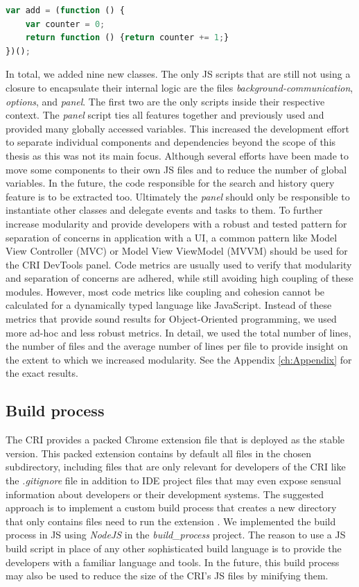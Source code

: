 \begin{lstlisting}[language=JavaScript, caption={Example of RxJS code.},label={lst:closure}]
var add = (function () {
	var counter = 0;
	return function () {return counter += 1;}
})();
\end{lstlisting}
In total, we added nine new classes. The only JS scripts that are still not using a closure to encapsulate their internal logic are the files \emph{background-communication}, \emph{options}, and \emph{panel}. The first two are the only scripts inside their respective context. The \emph{panel} script ties all features together and previously used and provided many globally accessed variables. This increased the development effort to separate individual components and dependencies beyond the scope of this thesis as this was not its main focus. Although several efforts have been made to move some components to their own JS files and to reduce the number of global variables. In the future, the code responsible for the search and history query feature is to be extracted too. Ultimately the \emph{panel} should only be responsible to instantiate other classes and delegate events and tasks to them. To further increase modularity and provide developers with a robust and tested pattern for separation of concerns in application with a UI, a common pattern like Model View Controller (MVC) or Model View ViewModel (MVVM) should be used for the CRI DevTools panel.
Code metrics are usually used to verify that modularity and separation of concerns are adhered, while still avoiding high coupling of these modules. However, most code metrics like coupling and cohesion \cite{Coupling} cannot be calculated for a dynamically typed language like JavaScript. Instead of these metrics that provide sound results for Object-Oriented programming, we used more ad-hoc and less robust metrics. In detail, we used the total number of lines, the number of files and the average number of lines per file to provide insight on the extent to which we increased modularity. See the Appendix \ref{ch:Appendix} for the exact results.
	
\subsection{Build process}
The CRI provides a packed Chrome extension file that is deployed as the stable version. This packed extension contains by default all files in the chosen subdirectory, including files that are only relevant for developers of the CRI like the \emph{.gitignore} file in addition to IDE project files that may even expose sensual information about developers or their development systems. The suggested approach is to implement a custom build process that creates a new directory that only contains files need to run the extension \cite{BuildScript}. We implemented the build process in JS using \emph{NodeJS} \cite{NodeJS} in the \emph{build\_process} project. The reason to use a JS build script in place of any other sophisticated build language is to provide the developers with a familiar language and tools. In the future, this build process may also be used to reduce the size of the CRI's JS files by minifying them. 